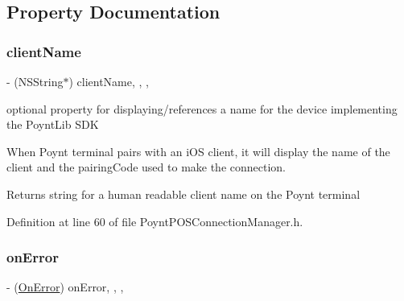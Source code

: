 \subsection{Property Documentation}
\hypertarget{interface_poynt_p_o_s_connection_manager_acc1c5e037cbbc59cd1b00f131660efe2}{}\label{interface_poynt_p_o_s_connection_manager_acc1c5e037cbbc59cd1b00f131660efe2} 
\subsubsection{\texorpdfstring{client\+Name}{clientName}}
{\footnotesize\ttfamily -\/ (N\+S\+String$\ast$) client\+Name\hspace{0.3cm}{\ttfamily [read]}, {\ttfamily [write]}, {\ttfamily [nonatomic]}, {\ttfamily [strong]}}



optional property for displaying/references a name for the device implementing the Poynt\+Lib S\+DK 

When Poynt terminal pairs with an i\+OS client, it will display the name of the client and the pairing\+Code used to make the connection.

\begin{DoxyReturn}{Returns}
string for a human readable client name on the Poynt terminal 
\end{DoxyReturn}


Definition at line 60 of file Poynt\+P\+O\+S\+Connection\+Manager.\+h.

\hypertarget{interface_poynt_p_o_s_connection_manager_a2ea439a383295e69bc2094a614e3b6fb}{}\label{interface_poynt_p_o_s_connection_manager_a2ea439a383295e69bc2094a614e3b6fb} 
\subsubsection{\texorpdfstring{on\+Error}{onError}}
{\footnotesize\ttfamily -\/ (\hyperlink{_poynt_p_o_s_connection_manager_8h_aef7c4526c1bcdb84233ca3d7f7074d5a}{On\+Error}) on\+Error\hspace{0.3cm}{\ttfamily [read]}, {\ttfamily [write]}, {\ttfamily [atomic]}, {\ttfamily [copy]}}



